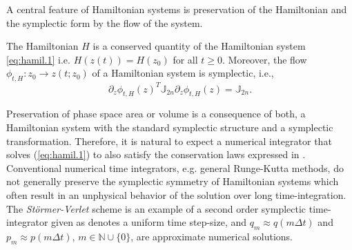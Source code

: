 
A central feature of Hamiltonian systems is preservation of the Hamiltonian and the symplectic form by the flow of the system.
\begin{theorem} \label{thm:1}
\cite{Marsden:2010:IMS:1965128} The Hamiltonian $H$ is a conserved quantity of the Hamiltonian system \eqref{eq:hamil.1} i.e. $H(z(t)) = H(z_0)$ for all $t \geq 0$. Moreover, the flow $\phi_{t,H}:z_0 \to z(t;z_0)$ of a Hamiltonian system is symplectic, i.e.,
$$\partial_z \phi_{t,H}(z)^T \mathbb J_{2n} \partial_z \phi_{t,H}(z) = \mathbb J_{2n}.$$
\end{theorem}

Preservation of phase space area or volume is a consequence of both, a Hamiltonian system with the standard symplectic structure and a symplectic transformation. Therefore, it is natural to expect a numerical integrator that solves (\ref{eq:hamil.1}) to also satisfy the conservation laws expressed in  . Conventional numerical time integrators, e.g. general Runge-Kutta methods, do not generally preserve the symplectic symmetry of Hamiltonian systems which often result in an unphysical behavior of the solution over long time-integration. The \emph{St\"ormer-Verlet} scheme is an example of a second order symplectic time-integrator given as
 denotes a uniform time step-size, and $q_m \approx q(m\Delta t)$ and $p_m \approx p(m\Delta t)$, $m \in \mathbb{N} \cup \{ 0\}$, are approximate numerical solutions.

